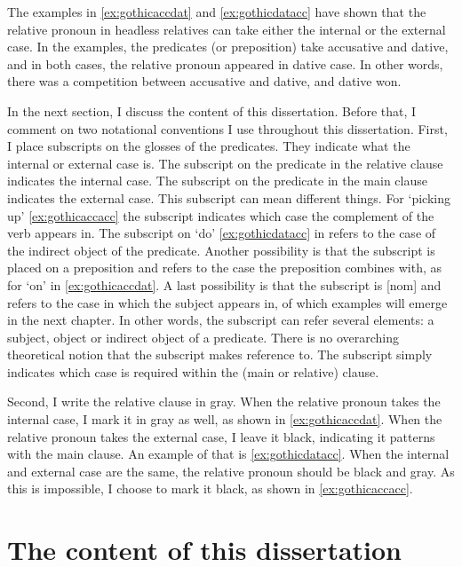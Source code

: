 The examples in \ref{ex:gothicaccdat} and \ref{ex:gothicdatacc} have shown that the relative pronoun in headless relatives can take either the internal or the external case. In the examples, the predicates (or preposition) take accusative and dative, and in both cases, the relative pronoun appeared in dative case. In other words, there was a competition between accusative and dative, and dative won.

In the next section, I discuss the content of this dissertation. Before that, I comment on two notational conventions I use throughout this dissertation. First, I place subscripts on the glosses of the predicates. They indicate what the internal or external case is. The subscript on the predicate in the relative clause indicates the internal case. The subscript on the predicate in the main clause indicates the external case. This subscript can mean different things.
For  `picking up' \ref{ex:gothicaccacc} the subscript indicates which case the complement of the verb appears in. The subscript on  `do' \ref{ex:gothicdatacc} in refers to the case of the indirect object of the predicate. Another possibility is that the subscript is placed on a preposition and refers to the case the preposition combines with, as for  `on' in \ref{ex:gothicaccdat}. A last possibility is that the subscript is [\ac{nom}] and refers to the case in which the subject appears in, of which examples will emerge in the next chapter.
In other words, the subscript can refer several elements: a subject, object or indirect object of a predicate. There is no overarching theoretical notion that the subscript makes reference to. The subscript simply indicates which case is required within the (main or relative) clause.

Second, I write the relative clause in gray. When the relative pronoun takes the internal case, I mark it in gray as well, as shown in \ref{ex:gothicaccdat}. When the relative pronoun takes the external case, I leave it black, indicating it patterns with the main clause. An example of that is \ref{ex:gothicdatacc}. When the internal and external case are the same, the relative pronoun should be black and gray. As this is impossible, I choose to mark it black, as shown in \ref{ex:gothicaccacc}.


\section{The content of this dissertation}

